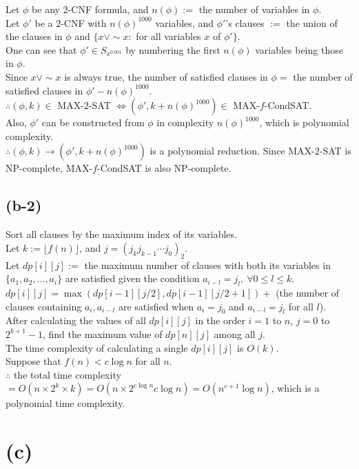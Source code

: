 Let $\phi$ be any $2$-CNF formula, and $n(\phi):=$ the number of variables in $\phi$.\\
Let $\phi'$ be a $2$-CNF with $n(\phi)^{1000}$ variables, and $\phi'$'s clauses $:=$ the union of the clauses in $\phi$ and $\{x\lor\sim x:$ for all variables $x$ of $\phi'\}$.\\
One can see that $\phi'\in S_{x^{0.001}}$ by numbering the first $n(\phi)$ variables being those in $\phi$.\\
Since $x\lor\sim x$ is always true, the number of satisfied clauses in $\phi=$ the number of satisfied clauses in $\phi'-n(\phi)^{1000}$.\\
$\therefore(\phi, k)\in$ MAX-$2$-SAT $\iff(\phi', k+n(\phi)^{1000})\in$ MAX-$f$-CondSAT.\\
Also, $\phi'$ can be constructed from $\phi$ in complexity $n(\phi)^{1000}$, which is polynomial complexity.\\
$\therefore(\phi, k)\to(\phi', k+n(\phi)^{1000})$ is a polynomial reduction. Since MAX-$2$-SAT is NP-complete, MAX-$f$-CondSAT is also NP-complete.

\subsection*{(b-2)}

Sort all clauses by the maximum index of its variables.\\
Let $k:=\lfloor f(n)\rfloor$, and $j=(j_kj_{k-1}\cdots j_0)_2$.\\
Let $dp[i][j]:=$ the maximum number of clauses with both its variables in $\{a_1, a_2, \dots, a_i\}$ are satisfied given the condition $a_{i-l}=j_l,\ \forall0\leq l\leq k$.\\
$dp[i][j]=\max(dp[i-1][j/2], dp[i-1][j/2+1])+$ (the number of clauses containing $a_i, a_{i-l}$ are satisfied when $a_i=j_0$ and $a_{i-l}=j_l$ for all $l$).\\
After calculating the values of all $dp[i][j]$ in the order $i=1$ to $n$, $j=0$ to $2^{k+1}-1$, find the maximum value of $dp[n][j]$ among all $j$.\\
The time complexity of calculating a single $dp[i][j]$ is $O(k)$.\\
Suppose that $f(n)<c\log n$ for all $n$.\\
$\therefore$ the total time complexity $=O(n\times2^k\times k)=O(n\times2^{c\log n}c\log n)=O(n^{c+1}\log n)$, which is a polynomial time complexity.

\section*{(c)}

